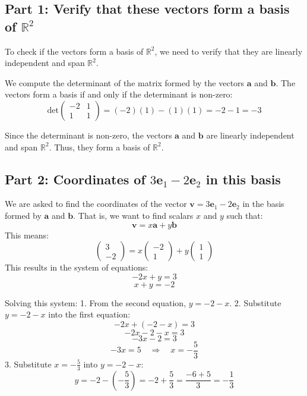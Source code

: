 \documentclass[11pt]{article}
\begin{document}
\subsection{Part 1: Verify that these vectors form a basis of \( \mathbb{R}^2 \)}

To check if the vectors form a basis of \( \mathbb{R}^2 \), we need to verify that they are linearly independent and span \( \mathbb{R}^2 \).

We compute the determinant of the matrix formed by the vectors \( \mathbf{a} \) and \( \mathbf{b} \). The vectors form a basis if and only if the determinant is non-zero:
\[
\text{det} \begin{pmatrix}
-2 & 1 \\
1 & 1
\end{pmatrix}
= (-2)(1) - (1)(1) = -2 - 1 = -3
\]

Since the determinant is non-zero, the vectors \( \mathbf{a} \) and \( \mathbf{b} \) are linearly independent and span \( \mathbb{R}^2 \). Thus, they form a basis of \( \mathbb{R}^2 \).

\newpage

\subsection{Part 2: Coordinates of \( 3 \mathbf{e}_1 - 2 \mathbf{e}_2 \) in this basis}

We are asked to find the coordinates of the vector \( \mathbf{v} = 3 \mathbf{e}_1 - 2 \mathbf{e}_2 \) in the basis formed by \( \mathbf{a} \) and \( \mathbf{b} \). That is, we want to find scalars \( x \) and \( y \) such that:
\[
\mathbf{v} = x \mathbf{a} + y \mathbf{b}
\]
This means:
\[
\begin{pmatrix} 3 \\ -2 \end{pmatrix} = x \begin{pmatrix} -2 \\ 1 \end{pmatrix} + y \begin{pmatrix} 1 \\ 1 \end{pmatrix}
\]
This results in the system of equations:
\[
-2x + y = 3
\]
\[
x + y = -2
\]

Solving this system:
1. From the second equation, \( y = -2 - x \).
2. Substitute \( y = -2 - x \) into the first equation:
\[
-2x + (-2 - x) = 3
\]
\[
-2x - 2 - x = 3
\]
\[
-3x - 2 = 3
\]
\[
-3x = 5 \quad \Rightarrow \quad x = -\frac{5}{3}
\]
3. Substitute \( x = -\frac{5}{3} \) into \( y = -2 - x \):
\[
y = -2 - \left( -\frac{5}{3} \right) = -2 + \frac{5}{3} = \frac{-6 + 5}{3} = -\frac{1}{3}
\]
\end{document}
